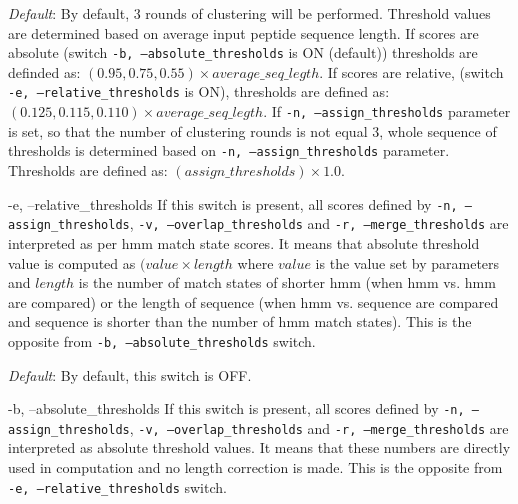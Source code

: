\documentclass[11pt, a4paper, twoside, titlepage]{article}
\begin{document}
\begin{description}
\begin{sloppypar}	
	 
	  \textit{Default}: By default, 3 rounds of clustering will be performed. Threshold values are determined based on average input peptide sequence length. If scores are absolute (switch \texttt{-b, --absolute\_thresholds} is ON (default)) thresholds are definded as: $(0.95, 0.75, 0.55)\times average\_seq\_legth$. If scores are relative, (switch \texttt{-e, --relative\_thresholds} is ON), thresholds are defined as: $(0.125, 0.115, 0.110)\times average\_seq\_legth$. If  \texttt{-n, --assign\_thresholds} parameter is set, so that the number of clustering rounds is not equal 3, whole sequence of thresholds is determined based on \texttt{-n, --assign\_thresholds} parameter. Thresholds are defined as: $(assign\_thresholds)\times 1.0$.
	  
\end{sloppypar}	

\begin{sloppypar}	
	  
	  \item[-e, --relative\_thresholds] If this switch is present, all scores defined by \texttt{-n, --assign\_thresholds}, \texttt{-v, --overlap\_thresholds} and \texttt{-r, --merge\_thresholds} are interpreted as per hmm match state scores. It means that absolute threshold value is computed as $(value\times length$ where $value$ is the value set by parameters and $length$ is the number of match states of shorter hmm (when hmm vs. hmm are compared) or the length of sequence (when hmm vs. sequence are compared and sequence is shorter than the number of hmm match states). This is the opposite from \texttt{-b, --absolute\_thresholds} switch.
	  
\end{sloppypar}	
	  
	    \textit{Default}: By default, this switch is OFF.
	
\begin{sloppypar}	
	  \item[-b, --absolute\_thresholds] If this switch is present, all scores defined by \texttt{-n, --assign\_thresholds}, \texttt{-v, --overlap\_thresholds} and \texttt{-r, --merge\_thresholds} are interpreted as absolute threshold values. It means that these numbers are directly used in computation and no length correction is made. This is the opposite from \texttt{-e, --relative\_thresholds} switch.
	
\end{sloppypar}	
	  

\end{description}
\end{document}
